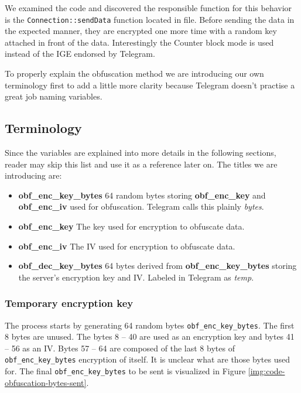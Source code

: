 \documentclass[thesis=M,english]{FITthesis}[2012/10/20]
\begin{document}
We examined the code and discovered the responsible function for this behavior is the \texttt{Connection::sendData} function located in  file. Before sending the data in the expected manner, they are encrypted one more time with a random key attached in front of the data. Interestingly the Counter block mode is used instead of the IGE endorsed by Telegram.

To properly explain the obfuscation method we are introducing our own terminology first to add a little more clarity because Telegram doesn't practise a great job naming variables.

\subsection{Terminology}

Since the variables are explained into more details in the following sections, reader may skip this list and use it as a reference later on. The titles we are introducing are:

\begin{itemize}
	\item \textbf{obf\_enc\_key\_bytes} 64 random bytes storing \textbf{obf\_enc\_key} and \textbf{obf\_enc\_iv} used for obfuscation. Telegram calls this plainly \emph{bytes}.
	\item \textbf{obf\_enc\_key} The key used for encryption to obfuscate data.
	\item \textbf{obf\_enc\_iv} The IV used for encryption to obfuscate data.
	\item \textbf{obf\_dec\_key\_bytes} 64 bytes derived from \textbf{obf\_enc\_key\_bytes} storing the server's encryption key and IV. Labeled in Telegram as \emph{temp}.
\end{itemize}

\subsubsection{Temporary encryption key}\label{code-obf-enc-key}

The process starts by generating 64 random bytes \texttt{obf\_enc\_key\_bytes}. The first 8 bytes are unused. The bytes 8 -- 40 are used as an encryption key and bytes 41 -- 56 as an IV. Bytes 57 -- 64 are composed of the last 8 bytes of \texttt{obf\_enc\_key\_bytes} encryption of itself. It is unclear what are those bytes used for. The final \texttt{obf\_enc\_key\_bytes} to be sent is visualized in Figure \ref{img:code-obfuscation-bytes-sent}.
\end{document}

